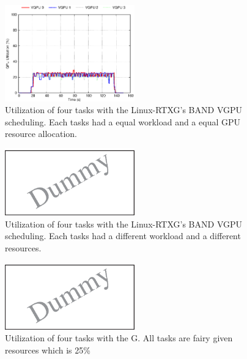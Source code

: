\begin{figure}[t]
\begin{center}
\includegraphics[width=0.5\textwidth]{img/band_rtx_fair}
\caption{Utilization of four tasks with the Linux-RTXG's BAND VGPU scheduling. Each tasks had a equal workload and a equal GPU resource allocation.}
\label{fig:band_rtx_fair}
\end{center}
\end{figure}

\begin{figure}[t]
\begin{center}
\includegraphics[width=0.5\textwidth]{img/band_rtx_diff}
\caption{Utilization of four tasks with the Linux-RTXG's BAND VGPU scheduling. Each tasks had a different workload and a different resources.}
\end{center}
\label{fig:band_rtx}
\end{figure}
\fi

\begin{figure}[t]
\begin{center}
\includegraphics[width=0.5\textwidth]{img/dummy}
\caption{Utilization of four tasks with the G. All tasks are fairy given resources which is 25\%}
\end{center}
\label{fig:qos_gdev}
\end{figure}
\fi

